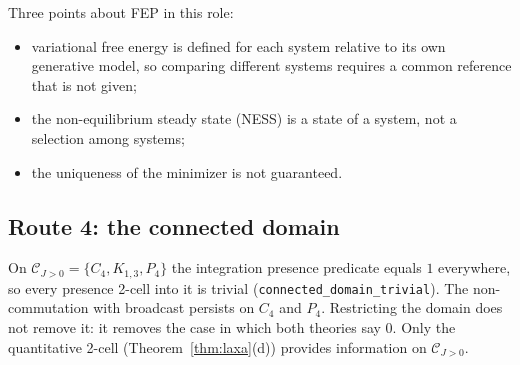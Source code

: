 Three points about FEP in this role:
\begin{itemize}
\item variational free energy is defined for each system relative to its own generative model, so comparing different systems requires a common reference that is not given;
\item the non-equilibrium steady state (NESS) is a state of a system, not a selection among systems;
\item the uniqueness of the minimizer is not guaranteed.
\end{itemize}

\subsection{Route 4: the connected domain}\label{sec:via4}
On $\mathcal C_{J>0}=\{C_4,K_{1,3},P_4\}$ the integration presence predicate equals $1$ everywhere, so every presence 2-cell into it is trivial (\texttt{connected\_domain\_trivial}). The non-commutation with broadcast persists on $C_4$ and $P_4$. Restricting the domain does not remove it: it removes the case in which both theories say 0. Only the quantitative 2-cell (Theorem~\ref{thm:laxa}(d)) provides information on $\mathcal C_{J>0}$.

